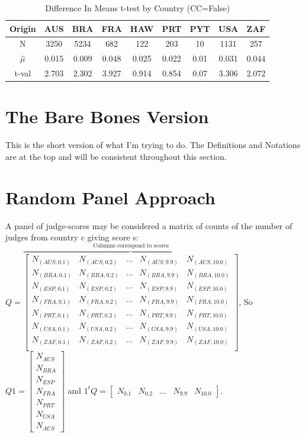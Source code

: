 \documentclass{article}
\begin{document}
\begin{table}
\caption{Difference In Means t-test by Country (CC=False)}
\label{DiffInMeansttestsCCfalse}
\begin{center} \begin{tabular}{|c|c|c|c|c|c|c|c|c|} \hline
Origin & AUS & BRA & FRA & HAW & PRT & PYT & USA & ZAF  \\ \hline
N & 3250 & 5234 & 682 & 122 & 203 & 10 & 1131 & 257  \\ \hline
$\hat{\mu}$ & 0.015 & 0.009 & 0.048 & 0.025 & 0.022 & 0.01 & 0.031 & 0.044  \\ \hline
t-val & 2.703 & 2.302 & 3.927 & 0.914 & 0.854 & 0.07 & 3.306 & 2.072  \\ \hline
\end{tabular} \end{center}
\end{table}

\section{The Bare Bones Version}
This is the short version of what I'm trying to do. 
The Definitions and Notations are at the top and will be consistent throughout this section.

\section{Random Panel Approach}
A panel of judge-scores may be considered a matrix of counts of the number of judges from country c giving score s:
$ Q = \overbrace{\begin{bmatrix}
N_{(AUS,0.1)} & N_{(AUS,0.2)} & \dots & N_{(AUS,9.9)} & N_{(AUS,10.0)} \\
N_{(BRA,0.1)} & N_{(BRA,0.2)} & \dots & N_{(BRA,9.9)} & N_{(BRA,10.0)} \\
N_{(ESP,0.1)} & N_{(ESP,0.2)} & \dots & N_{(ESP,9.9)} & N_{(ESP,10.0)} \\
N_{(FRA,0.1)} & N_{(FRA,0.2)} & \dots & N_{(FRA,9.9)} & N_{(FRA,10.0)} \\
N_{(PRT,0.1)} & N_{(PRT,0.2)} & \dots & N_{(PRT,9.9)} & N_{(PRT,10.0)} \\
N_{(USA,0.1)} & N_{(USA,0.2)} & \dots & N_{(USA,9.9)} & N_{(USA,10.0)} \\
N_{(ZAF,0.1)} & N_{(ZAF,0.2)} & \dots & N_{(ZAF,9.9)} & N_{(ZAF,10.0)} \\
\end{bmatrix}}^{\text{Columns correspond to scores}}$, So $Q 1 = \begin{bmatrix}N_{AUS}\\ N_{BRA}\\N_{ESP}\\ N_{FRA}\\ N_{PRT}\\ N_{USA}\\N_{AUS}  \end{bmatrix}$ 
and $1^t Q = \begin{bmatrix} N_{0.1} & N_{0.2} & \dots & N_{9.9} & N_{10.0}\end{bmatrix}$.
\end{document}
